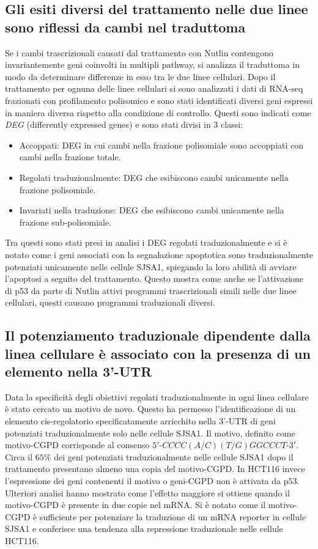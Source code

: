  \subsection{Gli esiti diversi del trattamento nelle due linee sono riflessi da cambi nel traduttoma}
  Se i cambi trascrizionali causati dal trattamento con Nutlin contengono invariantemente geni coinvolti in multipli pathway, si analizza il traduttoma in modo da determinare differenze in esso tra le due linee cellulari.
  Dopo il trattamento per ognuna delle linee cellulari si sono analizzati i dati di RNA-seq frazionati con profilamento polisomico e sono stati identificati diversi geni espressi in maniera diversa rispetto alla condizione di controllo.
  Questi sono indicati come \emph{DEG} (differently expressed genes) e sono stati divisi in $3$ classi:
  \begin{itemize}
    \item Accoppati: DEG in cui cambi nella frazione polisomiale sono accoppiati con cambi nella frazione totale.
    \item Regolati traduzionalmente: DEG che esibiscono cambi unicamente nella frazione polisomiale.
    \item Invariati nella traduzione: DEG che esibiscono cambi unicamente nella frazione sub-polisomiale.
  \end{itemize}
  Tra questi sono stati presi in analisi i DEG regolati traduzionalmente e si \`e notato come i geni associati con la segnalazione apoptotica sono traduzionalmente potenziati unicamente nelle cellule SJSA1, spiegando la loro abilit\`a di avviare l'apoptosi a seguito del trattamento.
  Questo mostra come anche se l'attivazione di p53 da parte di Nutlin attivi programmi trascrizionali simili nelle due linee cellulari, questi causano programmi traduzionali diversi.

  \subsection{Il potenziamento traduzionale dipendente dalla linea cellulare \`e associato con la presenza di un elemento nella 3'-UTR}
  \label{subsec:cgpd}
  Data la specificit\`a degli obiettivi regolati traduzionalmente in ogni linea cellulare \`e stato cercato un motivo de novo.
  Questo ha permesso l'identificazione di un elemento cis-regolatorio specificatamente arricchito nella 3'-UTR di geni potenziati traduzionalmente solo nelle cellule SJSA1.
  Il motivo, definito come motivo-CGPD corrisponde al consenso $5'$-$CCCC(A/C)(T/G)GGCCCT$-$3'$.
  Circa il $65\%$ dei geni potenziati traduzionalmente nelle cellule SJSA1 dopo il trattamento presentano almeno una copia del motivo-CGPD.
  In HCT116 invece l'espressione dei geni contenenti il motivo o geni-CGPD non \`e attivata da p53.\\
  Ulteriori analisi hanno mostrato come l'effetto maggiore si ottiene quando il motivo-CGPD \`e presente in due copie nel mRNA.
  Si \`e notato come il motivo-CGPD \`e sufficiente per potenziare la traduzione di un mRNA reporter in cellule SJSA1 e conferisce una tendenza alla repressione traduzionale nelle cellule HCT116.

